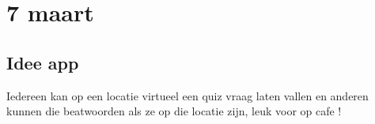 \section{7 maart}
\subsection{Idee app}
Iedereen kan op een locatie virtueel een quiz vraag laten vallen en anderen kunnen die beatwoorden als ze op die locatie zijn, leuk voor op cafe ! 
